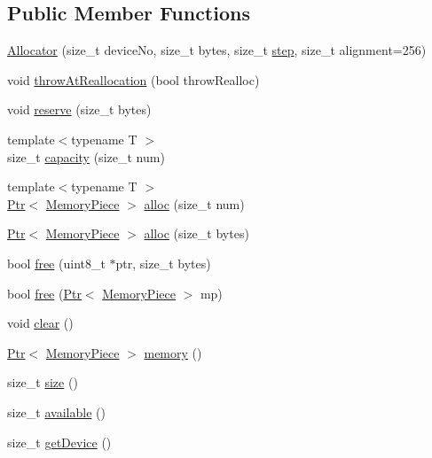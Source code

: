 \subsection*{Public Member Functions}
\begin{DoxyCompactItemize}
\item 
\hyperlink{classmarian_1_1Allocator_ae2f62305efe8dacd88646dcc682cf456}{Allocator} (size\+\_\+t device\+No, size\+\_\+t bytes, size\+\_\+t \hyperlink{namespacemarian_a2e7193e67292a4c3347f296f5e669581}{step}, size\+\_\+t alignment=256)
\item 
void \hyperlink{classmarian_1_1Allocator_a7481723a5cde8f7c10e56733fc5b9fcc}{throw\+At\+Reallocation} (bool throw\+Realloc)
\item 
void \hyperlink{classmarian_1_1Allocator_afdac64600119b40b07cb12626f343d6a}{reserve} (size\+\_\+t bytes)
\item 
{\footnotesize template$<$typename T $>$ }\\size\+\_\+t \hyperlink{classmarian_1_1Allocator_a17a7469579d224e54ba0740d72db3f80}{capacity} (size\+\_\+t num)
\item 
{\footnotesize template$<$typename T $>$ }\\\hyperlink{namespacemarian_ad1a373be43a00ef9ce35666145137b08}{Ptr}$<$ \hyperlink{classmarian_1_1MemoryPiece}{Memory\+Piece} $>$ \hyperlink{classmarian_1_1Allocator_aeddab9eeed82b8702c22d91a105d644b}{alloc} (size\+\_\+t num)
\item 
\hyperlink{namespacemarian_ad1a373be43a00ef9ce35666145137b08}{Ptr}$<$ \hyperlink{classmarian_1_1MemoryPiece}{Memory\+Piece} $>$ \hyperlink{classmarian_1_1Allocator_a7deb1124f98c6f1befd7455326478e7c}{alloc} (size\+\_\+t bytes)
\item 
bool \hyperlink{classmarian_1_1Allocator_a26b71806d3b207af1a2f983c4979487d}{free} (uint8\+\_\+t $\ast$ptr, size\+\_\+t bytes)
\item 
bool \hyperlink{classmarian_1_1Allocator_a63bea58b067fce5cdb99365b00075887}{free} (\hyperlink{namespacemarian_ad1a373be43a00ef9ce35666145137b08}{Ptr}$<$ \hyperlink{classmarian_1_1MemoryPiece}{Memory\+Piece} $>$ mp)
\item 
void \hyperlink{classmarian_1_1Allocator_a8f6497f24fdf8509c29a73b76667a66a}{clear} ()
\item 
\hyperlink{namespacemarian_ad1a373be43a00ef9ce35666145137b08}{Ptr}$<$ \hyperlink{classmarian_1_1MemoryPiece}{Memory\+Piece} $>$ \hyperlink{classmarian_1_1Allocator_a0d674662cfae11d3e221dbf1f764a49b}{memory} ()
\item 
size\+\_\+t \hyperlink{classmarian_1_1Allocator_a93bed619eb9ee33bea60953aae2451bb}{size} ()
\item 
size\+\_\+t \hyperlink{classmarian_1_1Allocator_a557ffeb3d6563ac533e5e9a7e334f8bd}{available} ()
\item 
size\+\_\+t \hyperlink{classmarian_1_1Allocator_ab9cde5e32bc9d9bf836540f58a697103}{get\+Device} ()
\end{DoxyCompactItemize}
